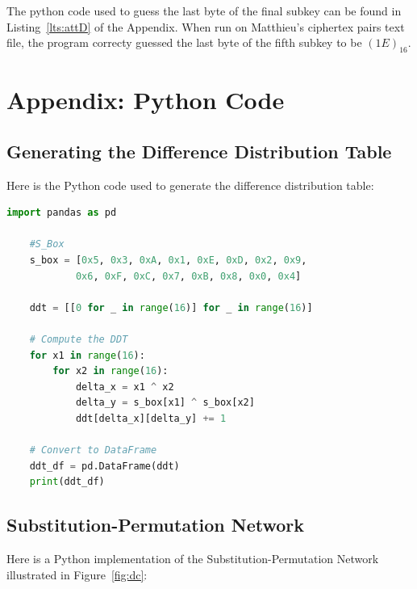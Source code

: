 \documentclass[letterpaper,12pt]{article}
\begin{document}
The python code used to guess the last byte of the final subkey can be found in Listing~\ref{lts:attD} of the Appendix. When run on Matthieu's ciphertex pairs text file,
the program correcty guessed the last byte of the fifth subkey to be $(1E)_{16}$.

\newpage
\appendix
\section*{Appendix: Python Code}
\label{sec:appendix}

\subsection*{Generating the Difference Distribution Table}

Here is the Python code used to generate the difference distribution table:

\begin{lstlisting}[language=Python, caption=Python code for Difference Distribution Table (ddt.py), label=lts:ddt]
    import pandas as pd
    
    #S_Box
    s_box = [0x5, 0x3, 0xA, 0x1, 0xE, 0xD, 0x2, 0x9,
            0x6, 0xF, 0xC, 0x7, 0xB, 0x8, 0x0, 0x4]

    ddt = [[0 for _ in range(16)] for _ in range(16)]

    # Compute the DDT
    for x1 in range(16):
        for x2 in range(16):
            delta_x = x1 ^ x2
            delta_y = s_box[x1] ^ s_box[x2]
            ddt[delta_x][delta_y] += 1

    # Convert to DataFrame
    ddt_df = pd.DataFrame(ddt)
    print(ddt_df)
    \end{lstlisting}

\subsection*{Substitution-Permutation Network}

Here is a Python implementation of the Substitution-Permutation Network illustrated in Figure~\ref{fig:dc}:
    
\end{document}
